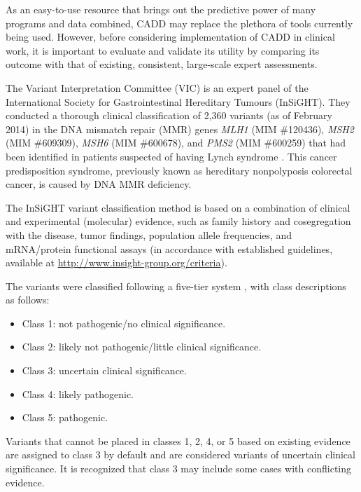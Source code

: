 As an easy-to-use resource that brings out the predictive power of many programs and data combined, CADD may replace the plethora of tools currently being used.
However, before considering implementation of CADD in clinical work, it is important to evaluate and validate its utility by comparing its outcome with that of existing, consistent, large-scale expert assessments.

The Variant Interpretation Committee (VIC) is an expert panel of the International Society for Gastrointestinal Hereditary Tumours (InSiGHT).
They conducted a thorough clinical classification of 2,360 variants (as of February 2014) in the DNA mismatch repair (MMR) genes \textsl{MLH1} (MIM \#120436), \textsl{MSH2} (MIM \#609309), \textsl{MSH6} (MIM \#600678), and \textsl{PMS2} (MIM \#600259) that had been identified in patients suspected of having Lynch syndrome \cite{Thompson_2013b}.
This cancer predisposition syndrome, previously known as hereditary nonpolyposis colorectal cancer, is caused by DNA MMR deficiency.

The InSiGHT variant classification method is based on a combination of clinical and experimental (molecular) evidence, such as family history and cosegregation with the disease, tumor findings, population allele frequencies, and mRNA/protein functional assays (in accordance with established guidelines, available at \url{http://www.insight-group.org/criteria}).

The variants were classified following a five-tier system \cite{Plon_2008}, with class descriptions as follows:

\begin{itemize}
\item Class 1: not pathogenic/no clinical significance.
\item Class 2: likely not pathogenic/little clinical significance.
\item Class 3: uncertain clinical significance.
\item Class 4: likely pathogenic.
\item Class 5: pathogenic.
\end{itemize}

Variants that cannot be placed in classes 1, 2, 4, or 5 based on existing evidence are assigned to class 3 by default and are considered variants of uncertain clinical significance. It is recognized \cite{Thompson_2013b} that class 3 may include some cases with conflicting evidence.

